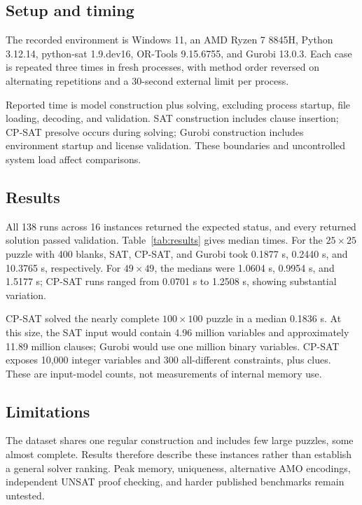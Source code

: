 \documentclass[a4paper,fleqn]{cas-sc}
\begin{document}
\subsection{Setup and timing}
The recorded environment is Windows 11, an AMD Ryzen 7 8845H, Python 3.12.14, python-sat 1.9.dev16, OR-Tools 9.15.6755, and Gurobi 13.0.3. Each case is repeated three times in fresh processes, with method order reversed on alternating repetitions and a 30-second external limit per process.

Reported time is model construction plus solving, excluding process startup, file loading, decoding, and validation. SAT construction includes clause insertion; CP-SAT presolve occurs during solving; Gurobi construction includes environment startup and license validation. These boundaries and uncontrolled system load affect comparisons.

\subsection{Results}
All 138 runs across 16 instances returned the expected status, and every returned solution passed validation. Table~\ref{tab:results} gives median times. For the \(25\times25\) puzzle with 400 blanks, SAT, CP-SAT, and Gurobi took 0.1877 s, 0.2440 s, and 10.3765 s, respectively. For \(49\times49\), the medians were 1.0604 s, 0.9954 s, and 1.5177 s; CP-SAT runs ranged from 0.0701 s to 1.2508 s, showing substantial variation.



CP-SAT solved the nearly complete \(100\times100\) puzzle in a median 0.1836 s. At this size, the SAT input would contain 4.96 million variables and approximately 11.89 million clauses; Gurobi would use one million binary variables. CP-SAT exposes 10,000 integer variables and 300 all-different constraints, plus clues. These are input-model counts, not measurements of internal memory use.

\subsection{Limitations}
The dataset shares one regular construction and includes few large puzzles, some almost complete. Results therefore describe these instances rather than establish a general solver ranking. Peak memory, uniqueness, alternative AMO encodings, independent UNSAT proof checking, and harder published benchmarks remain untested.
\end{document}
